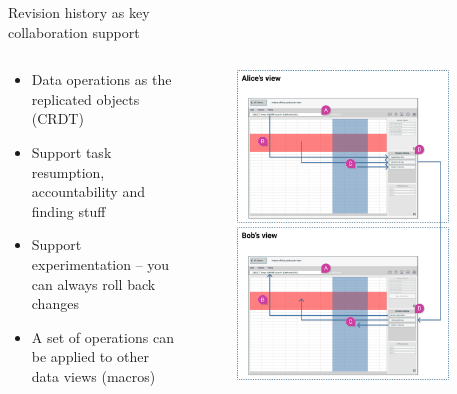 \documentclass[aspectratio=169]{beamer}
\begin{document}
\begin{frame}{Revision history as key\\ collaboration support}
    \begin{columns}
        \begin{column}{0.5\textwidth}
            \begin{itemize}
                \small
                \item Data operations as the replicated objects (CRDT)
                \item Support task resumption, accountability and finding stuff
                \item Support experimentation -- you can always roll back changes
                \item A set of operations can be applied to other data views (macros)
            \end{itemize}
        \end{column}
        \begin{column}{0.5\textwidth}
            \begin{figure}[h]
                \vspace{-4em}
                \centering
                \includegraphics[width=0.9\textwidth]{images/shared-history.png}
            \end{figure}
        \end{column}
    \end{columns}
\end{frame}
\end{document}

